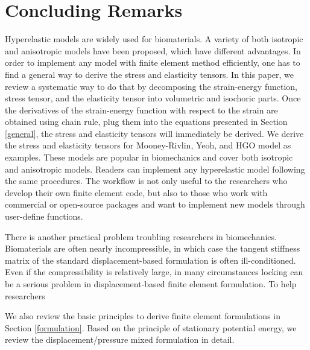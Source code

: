 \section{Concluding Remarks}
Hyperelastic models are widely used for biomaterials. A variety of both isotropic and anisotropic models have been proposed, which have different advantages. In order to implement any model with finite element method efficiently, one has to find a general way to derive the stress and elasticity tensors. In this paper, we review a systematic way to do that by decomposing the strain-energy function, stress tensor, and the elasticity tensor into volumetric and isochoric parts. Once the derivatives of the strain-energy function with respect to the strain are obtained using chain rule, plug them into the equations presented in Section \ref{general}, the stress and elasticity tensors will immediately be derived. We derive the stress and elasticity tensors for Mooney-Rivlin, Yeoh, and HGO model as examples. These models are popular in biomechanics and cover both isotropic and anisotropic models. Readers can implement any hyperelastic model following the same procedures. The workflow is not only useful to the researchers who develop their own finite element code, but also to those who work with commercial or open-source packages and want to implement new models through user-define functions.

There is another practical problem troubling researchers in biomechanics. Biomaterials are often nearly incompressible, in which case the tangent stiffness matrix of the standard displacement-based formulation is often ill-conditioned. Even if the compressibility is relatively large, in many circumstances locking can be a serious problem in displacement-based finite element formulation. To help researchers

We also review the basic principles to derive finite element formulations in Section \ref{formulation}. Based on the principle of stationary potential energy, we review the displacement/pressure mixed formulation in detail. 